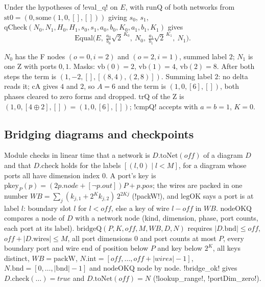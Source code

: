\begin{theorem}
Under the hypotheses of \lean!eval_q! on $E$, with $\mathrm{runQ}$ of both networks from $\mathrm{st0}=(0,\mathrm{some}(1,0,[],[]))$ giving $s_0$, $s_1$, $\mathrm{qCheck}(N_0,N_1,H_0,H_1,s_0,s_1,a_0,b_0,K_0,a_1,b_1,K_1)$ gives
\[
\mathrm{Equal}\bigl(E,\ \tfrac{a_0}{b_0}\sqrt2^{\,K_0},\ N_0,\ \tfrac{a_1}{b_1}\sqrt2^{\,K_1},\ N_1\bigr).
\]
\end{theorem}

\begin{example}
$N_0$ has the F nodes $(o{=}0,i{=}2)$ and $(o{=}2,i{=}1)$, summed label $2$; $N_1$ is one Z with ports $0,1$. Masks: $\mathrm{vb}(0)=2$, $\mathrm{vb}(1)=4$, $\mathrm{vb}(2)=8$. After both steps the term is $(1,-2,[],[(8,4),(2,8)])$. Summing label $2$: no delta reads it; $\mathrm{cA}$ gives $4$ and $2$, so $A=6$ and the term is $(1,0,[6],[])$, both phases cleared to zero forms and dropped. $\mathrm{trQ}$ of the Z is $(1,0,[4\oplus2],[])=(1,0,[6],[])$; \lean!cmpQ! accepts with $a=b=1$, $K=0$.
\end{example}

\subsection{Bridging diagrams and checkpoints}

Module  checks in linear time that a network is $D.\mathrm{toNet}(\mathit{off})$ of a diagram $D$ and that $D.\mathrm{check}$ holds for the labels $[(l,0)\mid l<M]$, for a diagram whose ports all have dimension index $0$. A port's key is $\mathrm{pkey}_P(p)=(2p.\mathit{node}+[\lnot p.\mathit{out}])P+p.\mathit{pos}$; the wires are packed in one number $\mathit{WB}=\sum_j(k_{j,1}+2^Kk_{j,2})\,2^{2Kj}$ (\lean!packW!), and $\mathrm{legOK}$ says a port is at label $l$: boundary slot $l$ for $l<\mathit{off}$, else a key of wire $l-\mathit{off}$ in $\mathit{WB}$. $\mathrm{nodeOKQ}$ compares a node of $D$ with a network node (kind, dimension, phase, port counts, each port at its label). $\mathrm{bridgeQ}(P,K,\mathit{off},M,\mathit{WB},D,N)$ requires $|D.\mathrm{bnd}|\le\mathit{off}$, $\mathit{off}+|D.\mathrm{wires}|\le M$, all port dimensions $0$ and port counts at most $P$, every boundary port and wire end of position below $P$ and key below $2^K$, all keys distinct, $\mathit{WB}=\mathrm{packW}$, $N.\mathrm{int}=[\mathit{off},\dots,\mathit{off}+|\mathit{wires}|-1]$, $N.\mathrm{bnd}=[0,\dots,|\mathrm{bnd}|-1]$ and $\mathrm{nodeOKQ}$ node by node. \lean!bridge_ok! gives $D.\mathrm{check}(\ldots)=\mathit{true}$ and $D.\mathrm{toNet}(\mathit{off})=N$ (\lean!lookup_range!, \lean!portDim_zero!).

